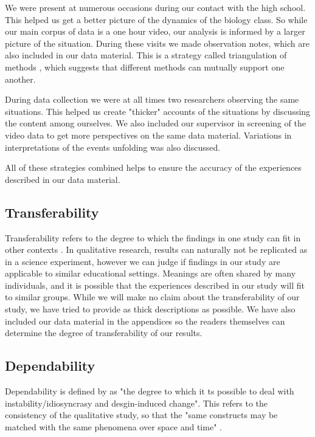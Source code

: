 We were present at numerous occasions during our contact with the high school. This helped us get a better picture of the dynamics of the biology class. So while our main corpus of data is a one hour video, our analysis is informed by a larger picture of the situation. During these visits we made observation notes, which are also included in our data material. This is a strategy called triangulation of methods \citep{baxter1997evaluating}, which suggests that different methods can mutually support one another. 

During data collection we were at all times two researchers observing the same situations. This helped us create "thicker" \citep{geertz1973interpretation} accounts of the situations by discussing the content among ourselves. We also included our supervisor in screening of the video data to get more perspectives on the same data material. Variations in interpretations of the events unfolding was also discussed.

All of these strategies combined helps to ensure the accuracy of the experiences described in our data material. 

\subsection{Transferability}
Transferability refers to the degree to which the findings in one study can fit in other contexts \citep{baxter1997evaluating}. In qualitative research, results can naturally not be replicated as in a science experiment, however we can judge if findings in our study are applicable to similar educational settings. Meanings are often shared by many individuals, and it is possible that the experiences described in our study will fit to similar groups. 
While we will make no claim about the transferability of our study, we have tried to provide as thick descriptions as possible. We have also included our data material in the appendices so the readers themselves can determine the degree of transferability of our results. 

\subsection{Dependability}
Dependability is defined by \citet{baxter1997evaluating} as "the degree to which it ts possible to deal with instability/idiosyncrasy and desgin-induced change". This refers to the consistency of the qualitative study, so that the "same constructs may be matched with the same phenomena over space and time" \citep{baxter1997evaluating}. 

